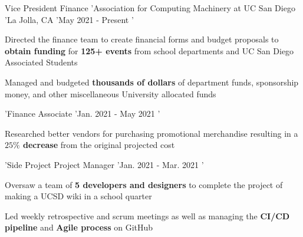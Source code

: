 

\begin{cventries}

\readlist\arg
  {Vice President Finance
  'Association for Computing Machinery at UC San Diego
  'La Jolla, CA
  'May 2021 - Present
  '\begin{cvitems} %
	  \item Directed the finance team to create financial forms and budget proposals to \textbf{obtain funding} for \textbf{125+ events} from school departments and UC San Diego Associated Students
	  \item Managed and budgeted \textbf{thousands of dollars} of department funds, sponsorship money, and other miscellaneous University allocated funds
	\end{cvitems}
  'Finance Associate
  'Jan. 2021 - May 2021
  '\begin{cvitems}
	\item Researched better vendors for purchasing promotional merchandise resulting in a \textbf{$25\%$ decrease} from the original projected cost
   \end{cvitems}
   'Side Project Project Manager
   'Jan. 2021 - Mar. 2021
   '\begin{cvitems}
		  \item Oversaw a team of \textbf{5 developers and designers} to complete the project of making a UCSD wiki in a school quarter
		  \item Led weekly retrospective and scrum meetings as well as managing the \textbf{CI/CD pipeline} and \textbf{Agile process} on GitHub
	\end{cvitems}
  }
\end{cventries}
	